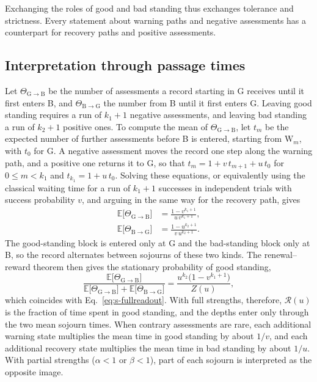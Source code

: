 \documentclass[10pt]{wlscirep}
\newcommand{\Rmap}{\mathscr{R}}            %
\newcommand{\st}[1]{\mathrm{#1}}           %
\theoremstyle{plain}
\theoremstyle{remark}
\begin{document}
Exchanging the roles of good and bad standing thus exchanges tolerance and strictness. Every statement about warning paths and negative assessments has a counterpart for recovery paths and positive assessments.

\subsection{Interpretation through passage times}

Let $\Theta_{\mathrm G\to\mathrm B}$ be the number of assessments a record starting in G receives until it first enters B, and $\Theta_{\mathrm B\to\mathrm G}$ the number from B until it first enters G. Leaving good standing requires a run of $k_1+1$ negative assessments, and leaving bad standing a run of $k_2+1$ positive ones. To compute the mean of $\Theta_{\mathrm G\to\mathrm B}$, let $t_m$ be the expected number of further assessments before B is entered, starting from $\st W_m$, with $t_0$ for G. A negative assessment moves the record one step along the warning path, and a positive one returns it to G, so that $t_m=1+v\,t_{m+1}+u\,t_0$ for $0\leq m<k_1$ and $t_{k_1}=1+u\,t_0$. Solving these equations, or equivalently using the classical waiting time for a run of $k_1+1$ successes in independent trials with success probability $v$, and arguing in the same way for the recovery path, gives
\begin{equation}
\begin{aligned}
\mathbb E\bigl[\Theta_{\mathrm G\to\mathrm B}\bigr]&=\frac{1-v^{k_1+1}}{u\,v^{k_1+1}},\\[2pt]
\mathbb E\bigl[\Theta_{\mathrm B\to\mathrm G}\bigr]&=\frac{1-u^{k_2+1}}{v\,u^{k_2+1}}.
\end{aligned}
\label{eq:s-passage}
\end{equation}
The good-standing block is entered only at G and the bad-standing block only at B, so the record alternates between sojourns of these two kinds. The renewal--reward theorem then gives the stationary probability of good standing,
\begin{equation}
\frac{\mathbb E\bigl[\Theta_{\mathrm G\to\mathrm B}\bigr]}{\mathbb E\bigl[\Theta_{\mathrm G\to\mathrm B}\bigr]+\mathbb E\bigl[\Theta_{\mathrm B\to\mathrm G}\bigr]}
=\frac{u^{k_2}\bigl(1-v^{k_1+1}\bigr)}{Z(u)},
\label{eq:s-renewal}
\end{equation}
which coincides with Eq.~\eqref{eq:s-fullreadout}. With full strengths, therefore, $\Rmap(u)$ is the fraction of time spent in good standing, and the depths enter only through the two mean sojourn times. When contrary assessments are rare, each additional warning state multiplies the mean time in good standing by about $1/v$, and each additional recovery state multiplies the mean time in bad standing by about $1/u$. With partial strengths ($\alpha<1$ or $\beta<1$), part of each sojourn is interpreted as the opposite image.
\end{document}
